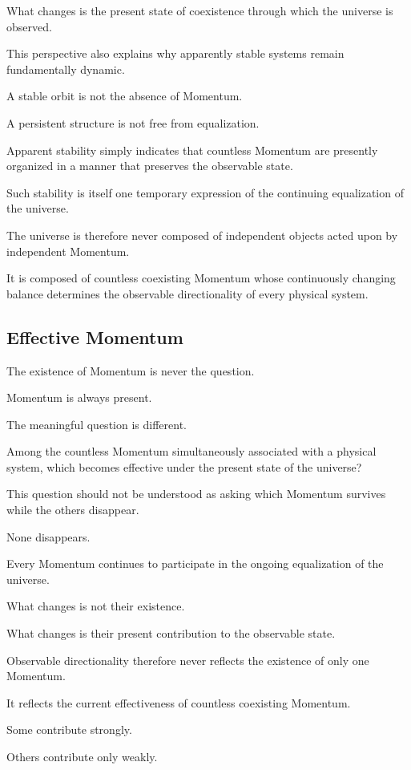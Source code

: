 What changes is the present state of coexistence through which the universe is observed.

This perspective also explains why apparently stable systems remain fundamentally dynamic.

A stable orbit is not the absence of Momentum.

A persistent structure is not free from equalization.

Apparent stability simply indicates that countless Momentum are presently organized in a manner that preserves the observable state.

Such stability is itself one temporary expression of the continuing equalization of the universe.

The universe is therefore never composed of independent objects acted upon by independent Momentum.

It is composed of countless coexisting Momentum whose continuously changing balance determines the observable directionality of every physical system.

\subsection*{\textbf{Effective Momentum}}


The existence of Momentum is never the question.

Momentum is always present.

The meaningful question is different.

Among the countless Momentum simultaneously associated with a physical system, which becomes effective under the present state of the universe?

This question should not be understood as asking which Momentum survives while the others disappear.

None disappears.

Every Momentum continues to participate in the ongoing equalization of the universe.

What changes is not their existence.

What changes is their present contribution to the observable state.

Observable directionality therefore never reflects the existence of only one Momentum.

It reflects the current effectiveness of countless coexisting Momentum.

Some contribute strongly.

Others contribute only weakly.

